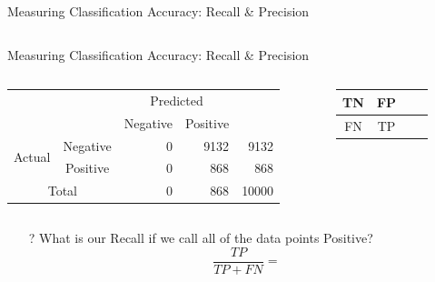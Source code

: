 \documentclass[aspectratio=169]{beamer}
\begin{document}
\begin{frame}{Measuring Classification Accuracy: Recall \& Precision}
\begin{columns}
\begin{column}{0.3\textwidth}
\end{column}
\end{columns}

\end{frame}
\begin{frame}{Measuring Classification Accuracy: Recall \& Precision}

\begin{columns}[c]
\begin{column}{0.7\textwidth}

\begin{tabular}{|c|c|r|r|r|} \hline
\multicolumn{2}{|c|}{}   &   \multicolumn{2}{c|}{Predicted}  & \\ \cline{3-4}
\multicolumn{2}{|c|}{} & Negative & Positive  & \\ \hline  
\multirow{2}{*}{Actual} & Negative & 0 & 9132  & 9132 \\ \cline{2-5}
 & Positive & 0 & 868  & 868 \\ \hline \hline
 \multicolumn{2}{|c|}{Total} & 0 & 868  & 10000\\ \hline
 \end{tabular}
\end{column}
\begin{column}{0.3\textwidth}

\begin{tabular}{|c|c|c|c|} \hline
TN & FP\\ \hline
FN & TP \\ \hline
 \end{tabular}
\end{column}
\end{columns}
\begin{itemize}
	\item[?] What is our Recall if we call all of the data points Positive?
	$$\frac{TP}{TP + FN} = $$
\end{itemize}

	
\end{frame}
\end{document}
